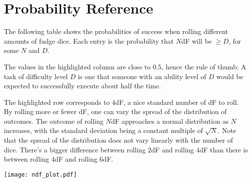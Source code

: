 \section{Probability Reference}

The following table shows the probabilities of success when rolling different amounts of fudge dice.
Each entry is the probability that $N$dF will be $\geq D$, for some $N$ and $D$.

\begin{center}

\end{center}

The values in the highlighted column are close to $0.5$,
hence the rule of thumb:
A task of difficulty level $D$ is one that someone with an ability level of $D$ would be expected to successfully execute about half the time.

The highlighted row corresponds to $4$dF, a nice standard number of dF to roll.
By rolling more or fewer dF, one can vary the spread of the distribution of outcomes.
The outcome of rolling $N$dF approaches a normal distribution as $N$ increases,
with the standard deviation being a constant multiple of $\sqrt{N}$.
Note that the spread of the distribution does not vary linearly with the number of dice.
There’s a bigger difference between rolling $2$dF and rolling $4$dF than there is between rolling $4$dF and rolling $6$dF.
\begin{center}
\texttt{[image: ndf\_plot.pdf]}
\end{center}
